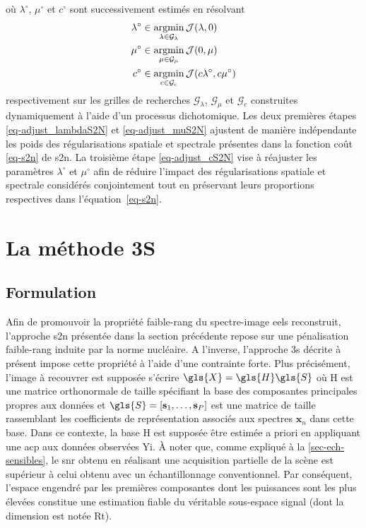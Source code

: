 où $\lambda^{\circ}$, $\mu^{\circ}$ et $c^{\circ}$ sont successivement estimés en résolvant
\begin{align}
\lambda^{\circ} &\in \argmin_{\lambda\in\mathcal{G}_{\lambda}} \mathcal{J}(\lambda,0) \label{eq-adjust_lambdaS2N}\\
%
\mu^{\circ} &\in \argmin_{\mu\in\mathcal{G}_{\mu}} \mathcal{J}(0,\mu) \label{eq-adjust_muS2N}\\
%
c^\circ &\in \argmin_{c\in\mathcal{G}_c} \mathcal{J}(c\lambda^{\circ},c\mu^{\circ})\label{eq-adjust_cS2N}
\end{align} 
respectivement sur les grilles de recherches $\mathcal{G}_{\lambda}$, $\mathcal{G}_{\mu}$ et $\mathcal{G}_{c}$ construites dynamiquement à l'aide d'un processus dichotomique. 
Les deux premières étapes \eqref{eq-adjust_lambdaS2N} et \eqref{eq-adjust_muS2N} ajustent de manière indépendante les poids des régularisations spatiale et spectrale présentes dans la fonction coût \eqref{eq-s2n} de \gls{s2n}.
La troisième étape \eqref{eq-adjust_cS2N} vise à réajuster les paramètres $\lambda^{\circ}$ et $\mu^{\circ}$ afin de réduire l'impact des régularisations spatiale et spectrale considérés conjointement tout en préservant leurs proportions respectives dans l'équation~\eqref{eq-s2n}.

%
\section{La méthode 3S}

\subsection{Formulation}\label{subsec-formulation-3s}

Afin de promouvoir la propriété faible-rang du spectre-image \gls{eels} reconstruit, l'approche \gls{s2n} présentée dans la section précédente repose sur une pénalisation faible-rang induite par la norme nucléaire. A l'inverse, l'approche \gls{3s} décrite à présent impose cette propriété à l'aide d'une contrainte forte.
Plus précisément, l'image à recouvrer est supposée s'écrire $\gls{X} = \gls{H}\gls{S}$ où \gls{H} est une matrice orthonormale de taille  spécifiant la base des composantes principales propres aux données et $\gls{S}=[\mathbf{s}_1, \dots, \mathbf{s}_P]$ est une matrice de taille  rassemblant les coefficients de représentation associés aux spectres $\mathbf{x}_n$ dans cette base.
Dans ce contexte, la base \gls{H} est supposée être estimée a priori en appliquant une \gls{acp} aux données observées \gls{Yi}.
%
\`A noter que, comme expliqué à la \cref{sec-ech-sensibles}, le \gls{snr} obtenu en réalisant une acquisition partielle de la scène est supérieur à celui obtenu avec un échantillonnage conventionnel. Par conséquent, l'espace engendré par les premières composantes dont les puissances sont les plus élevées constitue une estimation fiable du véritable sous-espace signal (dont la dimension est notée \gls{Rt}).

